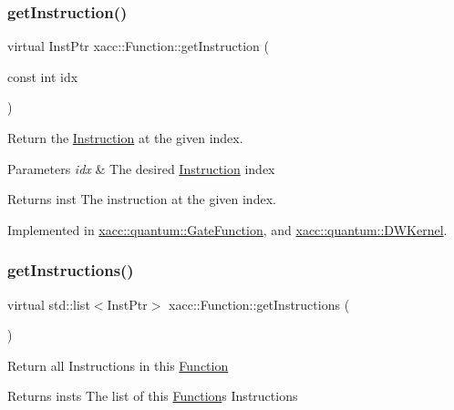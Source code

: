 \subsubsection{\texorpdfstring{get\+Instruction()}{getInstruction()}}
{\footnotesize\ttfamily virtual Inst\+Ptr xacc\+::\+Function\+::get\+Instruction (\begin{DoxyParamCaption}\item[{const int}]{idx }\end{DoxyParamCaption})\hspace{0.3cm}{\ttfamily [pure virtual]}}

Return the \hyperlink{a01657}{Instruction} at the given index.


\begin{DoxyParams}{Parameters}
{\em idx} & The desired \hyperlink{a01657}{Instruction} index \\
\hline
\end{DoxyParams}
\begin{DoxyReturn}{Returns}
inst The instruction at the given index. 
\end{DoxyReturn}


Implemented in \hyperlink{a01249_a841d656eed8aa9b4c0eec3f1da38069c}{xacc\+::quantum\+::\+Gate\+Function}, and \hyperlink{a01221_a00f23cd2e15ea6b9d00d4f3dbe1540f8}{xacc\+::quantum\+::\+D\+W\+Kernel}.

\mbox{\label{a01653_aaf80bd3d49113a92b520785572663032}} 
\subsubsection{\texorpdfstring{get\+Instructions()}{getInstructions()}}
{\footnotesize\ttfamily virtual std\+::list$<$Inst\+Ptr$>$ xacc\+::\+Function\+::get\+Instructions (\begin{DoxyParamCaption}{ }\end{DoxyParamCaption})\hspace{0.3cm}{\ttfamily [pure virtual]}}

Return all Instructions in this \hyperlink{a01653}{Function}

\begin{DoxyReturn}{Returns}
insts The list of this \hyperlink{a01653}{Function}\textquotesingle{}s Instructions 
\end{DoxyReturn}



